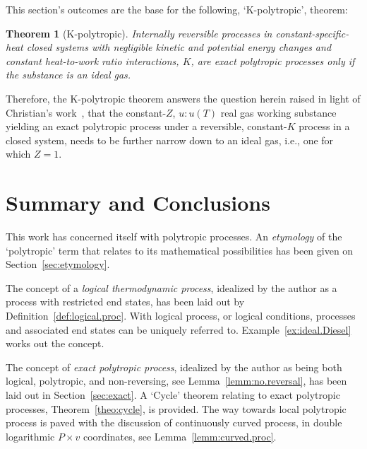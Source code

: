 \documentclass[fleqn,11pt]{SelfArx}
\newtheorem{theorem}{Theorem}
\begin{document}
    This section's outcomes are the base for the following, `K-polytropic', theorem:

    \begin{theorem}[K-polytropic]\label{theo:K.poly}
        Internally reversible processes in constant-specific-heat closed systems with negligible
        kinetic and potential energy changes and constant heat-to-work ratio interactions,  $K$,
        are exact polytropic processes only if the substance is an ideal gas.
    \end{theorem}

    Therefore, the  K-polytropic  theorem  answers  the  question  herein  raised  in  light  of
    Christian's    work~\cite{2012-ChristiansJ-IntJMechEngEduc},    that    the    constant-$Z$,
    $u\!:\!u(T)$ real gas working  substance  yielding  an  exact  polytropic  process  under  a
    reversible, constant-$K$ process in a closed system, needs to be further narrow down  to  an
    ideal gas, i.e., one for which $Z=1$.

\section{Summary and Conclusions}

    This work has concerned  itself  with  polytropic  processes.  An  \emph{etymology}  of  the
    `polytropic' term  that  relates  to  its  mathematical  possibilities  has  been  given  on
    Section~\ref{sec:etymology}.

    The concept of a \emph{logical thermodynamic process}, idealized by the author as a  process
    with restricted end states, has been laid  out  by  Definition~\ref{def:logical.proc}.  With
    logical process, or logical conditions, processes and associated end states can be  uniquely
    referred to. Example~\ref{ex:ideal.Diesel} works out the concept.

    The concept of \emph{exact polytropic process},  idealized  by  the  author  as  being  both
    logical, polytropic, and non-reversing, see Lemma~\ref{lemm:no.reversal}, has been laid  out
    in Section~\ref{sec:exact}. A  `Cycle'  theorem  relating  to  exact  polytropic  processes,
    Theorem~\ref{theo:cycle}, is provided. The way towards local  polytropic  process  is  paved
    with the discussion of continuously  curved  process,  in  double  logarithmic  $P\times  v$
    coordinates, see Lemma~\ref{lemm:curved.proc}.
\end{document}
